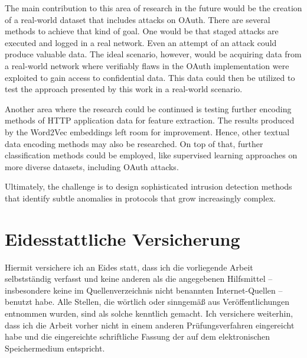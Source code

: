 \documentclass[
    fontsize=12pt,
    headings=small,
    parskip=half,           %
    bibliography=totoc,
    numbers=noenddot,       %
    open=any,               %
    ]{scrreprt}
\begin{document}
The main contribution to this area of research in the future would be the creation of a real-world dataset that includes attacks on OAuth. There are several methods to achieve that kind of goal. One would be that staged attacks are executed and logged in a real network. Even an attempt of an attack could produce valuable data. The ideal scenario, however, would be acquiring data from a real-world network where verifiably flaws in the OAuth implementation were exploited to gain access to confidential data. This data could then be utilized to test the approach presented by this work in a real-world scenario.

Another area where the research could be continued is testing further encoding methods of HTTP application data for feature extraction. The results produced by the Word2Vec embeddings left room for improvement. Hence, other textual data encoding methods may also be researched. On top of that, further classification methods could be employed, like supervised learning approaches on more diverse datasets, including OAuth attacks.

Ultimately, the challenge is to design sophisticated intrusion detection methods that identify subtle anomalies in protocols that grow increasingly complex.


\begin{raggedright}         %
  \printbibliography        %
  \label{sec:literaturverzeichnis}
\end{raggedright}


\appendix
\setcounter{figure}{0}
\renewcommand\thetable{A.\arabic{figure}}
\setcounter{table}{0}
\renewcommand\thetable{A.\arabic{table}}
\newpage
		
\chapter*{Eidesstattliche Versicherung} %
\vspace{1cm}

%
Hiermit versichere ich an Eides statt, dass ich die vorliegende Arbeit
selbstständig verfasst und keine anderen als die angegebenen Hilfsmittel –
insbesondere keine im Quellenverzeichnis nicht benannten Internet-Quellen –
benutzt habe. Alle Stellen, die wörtlich oder sinngemäß aus Veröffentlichungen
entnommen wurden, sind als solche kenntlich gemacht. Ich versichere weiterhin,
dass ich die Arbeit vorher nicht in einem anderen Prüfungsverfahren eingereicht
habe und die eingereichte schriftliche Fassung der auf dem elektronischen
Speichermedium entspricht.
\end{document}
